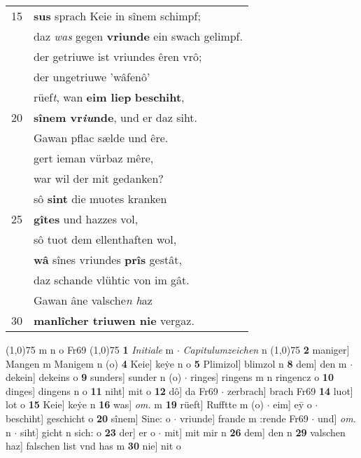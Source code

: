 \documentclass[8pt,a4paper,notitlepage]{article}
\begin{document}
\begin{table}[ht]
\begin{minipage}[t]{0.5\linewidth}
\begin{tabular}{rl}
15 & \textbf{sus} sprach Keie in sînem schimpf;\\ 
 & daz \textit{was} gegen \textbf{vriunde} ein swach gelimpf.\\ 
 & der getriuwe ist vriundes êren vrô;\\ 
 & der ungetriuwe 'wâfenô'\\ 
 & rüef\textit{t}, wan \textbf{eim liep} \textbf{beschiht},\\ 
20 & \textbf{sînem vr\textit{iu}nde}, und er daz siht.\\ 
 & Gawan pflac sælde und êre.\\ 
 & gert ieman vürbaz mêre,\\ 
 & war wil der mit gedanken?\\ 
 & sô \textbf{sint} die muotes kranken\\ 
25 & \textbf{gîtes} und hazzes vol,\\ 
 & sô tuot dem ellenthaften wol,\\ 
 & \textbf{wâ} sînes vriundes \textbf{prîs} gestât,\\ 
 & daz schande vlühtic von im gât.\\ 
 & Gawan âne valsche\textit{n h}az\\ 
30 & \textbf{manlîcher triuwen nie} vergaz.\\ 
\end{tabular}
\scriptsize
\line(1,0){75} \newline
m n o Fr69 \newline
\line(1,0){75} \newline
\textbf{1} \textit{Initiale} m   $\cdot$ \textit{Capitulumzeichen} n  \newline
\line(1,0){75} \newline
\textbf{2} maniger] Mangen m Manigem n (o) \textbf{4} Keie] keẏe n o \textbf{5} Plimizol] blimzol n \textbf{8} dem] den m  $\cdot$ dekein] dekeins o \textbf{9} sunders] sunder n (o)  $\cdot$ ringes] ringens m n ringencz o \textbf{10} dinges] dingens n o \textbf{11} niht] mit o \textbf{12} dô] da Fr69  $\cdot$ zerbrach] brach Fr69 \textbf{14} luot] lot o \textbf{15} Keie] keẏe n \textbf{16} was] \textit{om.} m \textbf{19} rüeft] Rufftte m (o)  $\cdot$ eim] eȳ o  $\cdot$ beschiht] geschicht o \textbf{20} sînem] Sine: o  $\cdot$ vriunde] frande m :rende Fr69  $\cdot$ und] \textit{om.} n  $\cdot$ siht] gicht n sich: o \textbf{23} der] er o  $\cdot$ mit] mit mir n \textbf{26} dem] den n \textbf{29} valschen haz] falschen list vnd has m \textbf{30} nie] nit o \newline
\end{minipage}
\end{table}
\end{document}
